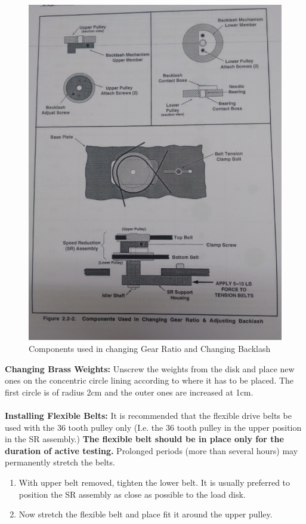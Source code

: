\documentclass[11pt, a4paper]{article}
\begin{document}
\begin{figure}[H]
\centering
\includegraphics[width = \textwidth]{gr_backlash.png}
\caption{Components used in changing Gear Ratio and Changing Backlash}
\label{Fig7}
\end{figure}
\textbf{Changing Brass Weights:} Unscrew the weights from the disk and place new ones on the concentric circle lining according to where it has to be placed. The first circle is of radius 2cm and the outer ones are increased at 1cm. \\ \\ 
\textbf{Installing Flexible Belts:} It is recommended that the flexible drive belts be used with the 36 tooth pulley only (I.e. the 36 tooth pulley in the upper position in the SR assembly.) \textbf{The flexible belt should be in place only for the duration of active testing.} Prolonged periods (more than several hours) may permanently stretch the belts.
\begin{enumerate}
\item With upper belt removed, tighten the lower belt. It is usually preferred to position the SR assembly as close as possible to the load disk.
\item Now stretch the flexible belt and place fit it around the upper pulley.
\end{enumerate}
\end{document}
